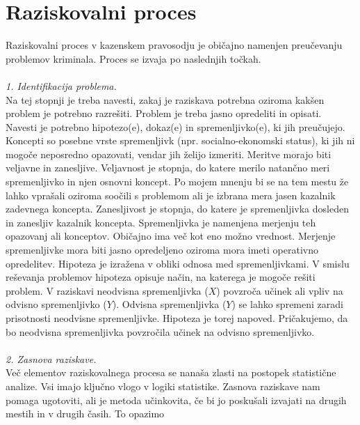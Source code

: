 \documentclass[12pt,a4paper]{amsart}
\theoremstyle{definition} %
\theoremstyle{plain} %
\begin{document}
\section{Raziskovalni proces}
Raziskovalni proces v kazenskem pravosodju je običajno namenjen preučevanju problemov kriminala. Proces se izvaja po naslednjih točkah.\\\\
\textit{1. Identifikacija problema.\\} 
Na tej stopnji je treba navesti, zakaj je raziskava potrebna oziroma kakšen problem je potrebno razrešiti. Problem je treba jasno opredeliti in opisati. 
Navesti je potrebno hipotezo(e), dokaz(e) in spremenljivko(e), ki jih preučujejo.\\
Koncepti so posebne vrste spremenljivk (npr. socialno-ekonomski status), ki jih ni mogoče neposredno opazovati, vendar jih želijo izmeriti. Meritve morajo biti 
veljavne in zanesljive. Veljavnost je stopnja, do katere merilo natančno meri spremenljivko in njen osnovni koncept. Po mojem mnenju bi se na tem mestu 
že lahko vprašali oziroma soočili s problemom ali je izbrana mera jasen kazalnik zadevnega koncepta. Zanesljivost je stopnja, do katere je 
spremenljivka dosleden in zanesljiv kazalnik koncepta. Spremenljivka je namenjena merjenju teh opazovanj ali konceptov. Običajno ima več kot 
eno možno vrednost. Merjenje spremenljivke mora biti jasno opredeljeno oziroma mora imeti operativno opredelitev. Hipoteza je izražena v 
obliki odnosa med spremenljivkami. V smislu reševanja problemov hipoteza opisuje način, na katerega je mogoče rešiti problem. V raziskavi 
neodvisna spremenljivka ($X$) povzroča učinek ali vpliv na odvisno spremenljivko ($Y$). Odvisna spremenljivka ($Y$) se lahko spremeni zaradi prisotnosti 
neodvisne spremenljivke. Hipoteza je torej napoved. Pričakujemo, da bo neodvisna spremenljivka povzročila učinek na odvisno spremenljivko.\\\\
\textit{2. Zasnova raziskave.\\} 
Več elementov raziskovalnega procesa se nanaša zlasti na postopek statistične analize. Vsi imajo ključno vlogo v logiki statistike. Zasnova raziskave 
nam pomaga ugotoviti, ali je metoda učinkovita, če bi jo poskušali izvajati na drugih mestih in v drugih časih. To opazimo 
\end{document}

